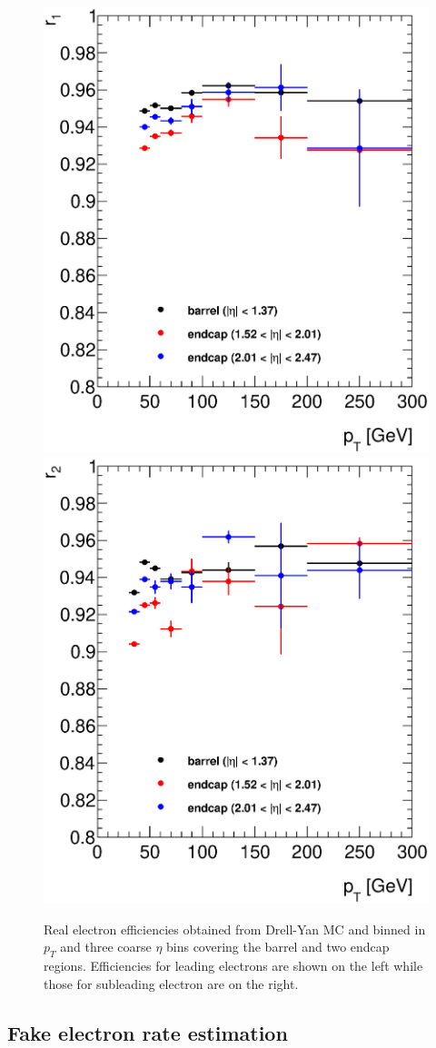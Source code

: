    \begin{figure}[h]
      \begin{center}
      \includegraphics[width=0.48\linewidth]{images/r1.eps}
      \includegraphics[width=0.48\linewidth]{images/r2.eps}
      \end{center}
   \caption{Real electron efficiencies obtained from Drell-Yan MC and binned in $p_{T}$ and three coarse $\eta$ bins covering the barrel and two endcap regions. Efficiencies for leading electrons are shown on the left while those for subleading electron are on the right.}
   \label{fig:realEff}
   \end{figure}



\subsection{Fake electron rate estimation}

